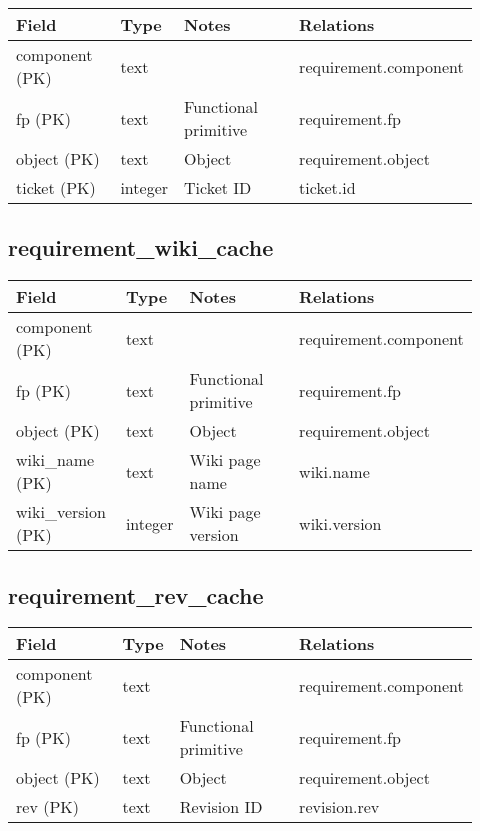 \documentclass{article}
\begin{document}
{\footnotesize
\begin{centering}
\begin{tabular}{p{0.25\linewidth}p{0.07\linewidth}p{0.3\linewidth}p{0.3\linewidth}}
\textbf{Field} & \textbf{Type} & \textbf{Notes} & \textbf{Relations} \\
\hline
component (PK) & text & & requirement.component \\
\hline
fp (PK) & text & Functional primitive & requirement.fp \\
\hline
object (PK) & text & Object & requirement.object \\
\hline
ticket (PK) & integer & Ticket ID & ticket.id \\
\hline
\end{tabular}
\end{centering}
}


\subsection{requirement\_wiki\_cache}

{\footnotesize
\begin{centering}
\begin{tabular}{p{0.25\linewidth}p{0.07\linewidth}p{0.3\linewidth}p{0.3\linewidth}}
\textbf{Field} & \textbf{Type} & \textbf{Notes} & \textbf{Relations} \\
\hline
component (PK) & text & & requirement.component \\
\hline
fp (PK) & text & Functional primitive & requirement.fp \\
\hline
object (PK) & text & Object & requirement.object \\
\hline
wiki\_name (PK) & text & Wiki page name & wiki.name \\
\hline
wiki\_version (PK) & integer & Wiki page version & wiki.version \\
\hline
\end{tabular}
\end{centering}
}


\subsection{requirement\_rev\_cache}

{\footnotesize
\begin{centering}
\begin{tabular}{p{0.25\linewidth}p{0.07\linewidth}p{0.3\linewidth}p{0.3\linewidth}}
\textbf{Field} & \textbf{Type} & \textbf{Notes} & \textbf{Relations} \\
\hline
component (PK) & text & & requirement.component \\
\hline
fp (PK) & text & Functional primitive & requirement.fp \\
\hline
object (PK) & text & Object & requirement.object \\
\hline
rev (PK) & text & Revision ID & revision.rev \\
\hline
\end{tabular}
\end{centering}
}
\end{document}
